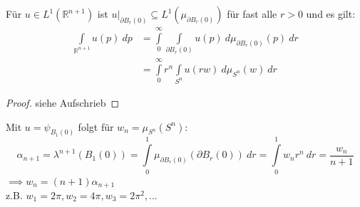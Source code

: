   \begin{theorem}[Zwiebelformel]
    Für $u \in L^1(\mathbb{R}^{n+1})$ ist $u|_{\partial B_r(0)} \subseteq L^1(\mu_{\partial B_r(0)})$ für fast alle $r>0$ und es gilt:
    \begin{align*}
      \int\limits_{\mathbb{R}^{n+1}} u(p) \ dp
      &= \int\limits_0^{\infty} \int\limits_{\partial B_r(0)} u(p) \ d\mu_{\partial B_r(0)}(p)\ dr\\
      &= \int\limits_0^{\infty} r^n \int\limits_{S^n} u(rw) \ d\mu_{S^n}(w)\ dr
    \end{align*}
  \end{theorem}
  \begin{proof}
    siehe Aufschrieb
  \end{proof}

  \newpage
  \begin{example}
    Mit $u = \psi_{B_1(0)}$ folgt für $w_n = \mu_{S^n}(S^n)$:
    $$\alpha_{n+1} = \lambda^{n+1}(B_1(0)) = \int\limits_0^1 \mu_{\partial B_r(0)} (\partial B_r(0)) \ dr = \int\limits_0^1 w_n r^n \ dr = \frac{w_n}{n+1}$$
    $\implies w_n = (n+1) \alpha_{n+1}$\\
    z.B. $w_1 = 2\pi, w_2 = 4\pi, w_3 = 2\pi^2, ...$
  \end{example}
